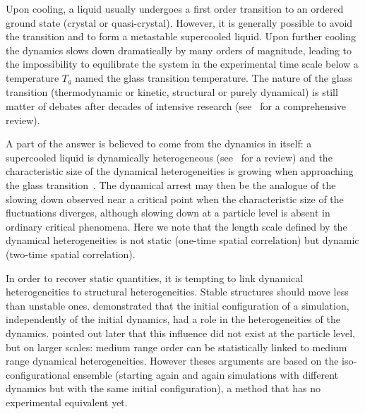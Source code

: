 
Upon cooling, a liquid usually undergoes a first order transition to an ordered ground state (crystal or quasi-crystal). However, it is generally possible to avoid the transition and to form a metastable supercooled liquid. Upon further cooling the dynamics slows down dramatically by many orders of magnitude, leading to the impossibility to equilibrate the system in the experimental time scale below a temperature $T_g$ named the glass transition temperature. The nature of the glass transition (thermodynamic or kinetic, structural or purely dynamical) is still matter of debates after decades of intensive research (see~\citep{cavagna2009supercooled} for a comprehensive review).

A part of the answer is believed to come from the dynamics in itself: a supercooled liquid is dynamically heterogeneous (see~\citep{Berthier2011} for a review) and the characteristic size of the dynamical heterogeneities is growing when approaching the glass transition~\citep{Donati1999, Berthier2005}. The dynamical arrest may then be the analogue of the slowing down observed near a critical point when the characteristic size of the fluctuations diverges, although slowing down at a particle level is absent in ordinary critical phenomena. Here we note that the length scale defined by the dynamical heterogeneities is not static (one-time spatial correlation) but dynamic (two-time spatial correlation). 

In order to recover static quantities, it is tempting to link dynamical heterogeneities to structural heterogeneities. Stable structures should move less than unstable ones. \citet{Widmer-Cooper2005} demonstrated that the initial configuration of a simulation, independently of the initial dynamics, had a role in the heterogeneities of the dynamics. \citet{Berthier2007} pointed out later that this influence did not exist at the particle level, but on larger scales: medium range order can be statistically linked to medium range dynamical heterogeneities. However theses arguments are based on the iso-configurational ensemble (starting again and again simulations with different dynamics but with the same initial configuration), a method that has no experimental equivalent yet.

